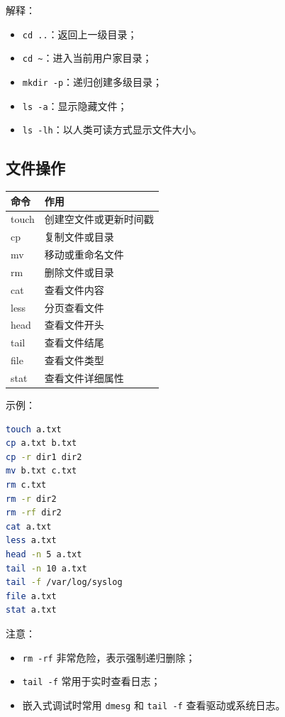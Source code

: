 \documentclass[UTF8,a4paper,12pt]{ctexart}
\begin{document}
解释：
\begin{itemize}
    \item \texttt{cd ..}：返回上一级目录；
    \item \texttt{cd \textasciitilde}：进入当前用户家目录；
    \item \texttt{mkdir -p}：递归创建多级目录；
    \item \texttt{ls -a}：显示隐藏文件；
    \item \texttt{ls -lh}：以人类可读方式显示文件大小。
\end{itemize}

\subsection{文件操作}

\begin{longtable}{p{4cm}p{10cm}}
\toprule
命令 & 作用 \\
\midrule
touch & 创建空文件或更新时间戳 \\
cp & 复制文件或目录 \\
mv & 移动或重命名文件 \\
rm & 删除文件或目录 \\
cat & 查看文件内容 \\
less & 分页查看文件 \\
head & 查看文件开头 \\
tail & 查看文件结尾 \\
file & 查看文件类型 \\
stat & 查看文件详细属性 \\
\bottomrule
\end{longtable}

示例：

\begin{lstlisting}[language=bash]
touch a.txt
cp a.txt b.txt
cp -r dir1 dir2
mv b.txt c.txt
rm c.txt
rm -r dir2
rm -rf dir2
cat a.txt
less a.txt
head -n 5 a.txt
tail -n 10 a.txt
tail -f /var/log/syslog
file a.txt
stat a.txt
\end{lstlisting}

注意：
\begin{itemize}
    \item \texttt{rm -rf} 非常危险，表示强制递归删除；
    \item \texttt{tail -f} 常用于实时查看日志；
    \item 嵌入式调试时常用 \texttt{dmesg} 和 \texttt{tail -f} 查看驱动或系统日志。
\end{itemize}
\end{document}
